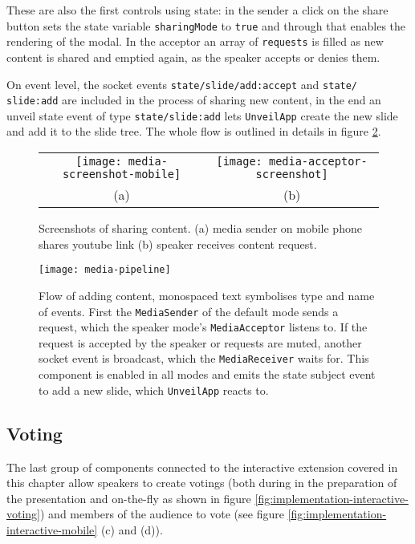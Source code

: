 These are also the first controls using state: in the sender a click on the share button sets the state variable \texttt{sharingMode} to \texttt{true} and through that enables the rendering of the modal. In the acceptor an array of \texttt{requests} is filled as new content is shared and emptied again, as the speaker accepts or denies them.

On event level, the socket events \texttt{state/slide/add:accept} and \texttt{state/ slide:add} are included in the process of sharing new content, in the end an unveil state event of type \texttt{state/slide:add} lets \texttt{UnveilApp} create the new slide and add it to the slide tree. The whole flow is outlined in details in figure \ref{fig:implementation-interactive-media-pipeline}.

\begin{figure}
\centering\small
\begin{tabular}{cc}
\texttt{[image: media-screenshot-mobile]}
 &
\texttt{[image: media-acceptor-screenshot]} \\
(a) & (b)
\end{tabular}
\caption{Screenshots of sharing content. (a) media sender on mobile phone shares youtube link (b) speaker receives content request.}
\label{fig:implementation-interactive-media}
\end{figure}

\begin{figure}
\centering
\texttt{[image: media-pipeline]}
\caption{Flow of adding content, monospaced text symbolises type and name of events. First the \texttt{MediaSender} of the default mode sends a request, which the speaker mode's \texttt{MediaAcceptor} listens to. If the request is accepted by the speaker or requests are muted, another socket event is broadcast, which the \texttt{MediaReceiver} waits for. This component is enabled in all modes and emits the state subject event to add a new slide, which \texttt{UnveilApp} reacts to.}
\label{fig:implementation-interactive-media-pipeline}
\end{figure}

\subsection{Voting}
\label{sec:implementation-interactive-voting}

The last group of components connected to the interactive extension covered in this chapter allow speakers to create votings (both during in the preparation of the presentation and on-the-fly as shown in figure \ref{fig:implementation-interactive-voting}) and members of the audience to vote (see figure \ref{fig:implementation-interactive-mobile} (c) and (d)).

